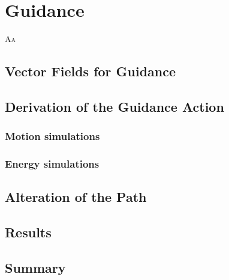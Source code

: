 
\chapter{\color{red}Guidance}
\label{cp:gd}


\lettrine{A}{a}


\section{\color{red}Vector Fields for Guidance}


\section{\color{red}Derivation of the Guidance Action}

\subsection{\color{red}Motion simulations}

\subsection{\color{red}Energy simulations}


\section{\color{red}Alteration of the Path}


\section{\color{red}Results}


\section{\color{red}Summary}

